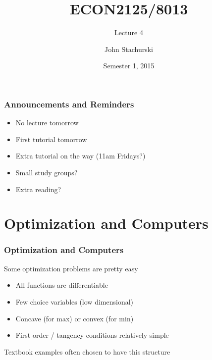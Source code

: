 






\title{ECON2125/8013}

\subtitle
{Lecture 4}

\author{John Stachurski}

\date{Semester 1, 2015}




\begin{frame}
  \titlepage
\end{frame}


\begin{frame}
    \frametitle{Announcements and Reminders}

    \begin{itemize}
        \item No lecture tomorrow
            \vspace{1em}
        \item First tutorial tomorrow
            \vspace{1em}
        \item Extra tutorial on the way (11am Fridays?)
            \vspace{1em}
        \item Small study groups?
            \vspace{1em}
        \item Extra reading?
    \end{itemize}
    
\end{frame}





\section{Optimization and Computers}


\begin{frame}
    \frametitle{Optimization and Computers}

    Some optimization problems are pretty easy

    \begin{itemize}
        \item All functions are differentiable
            \vspace{1em}
        \item Few choice variables (low dimensional)
            \vspace{1em}
        \item Concave (for max) or convex (for min)
            \vspace{1em}
        \item First order / tangency conditions relatively simple
    \end{itemize}

            \vspace{1em}

    Textbook examples often chosen to have this structure

\end{frame}


